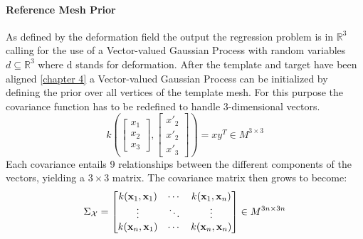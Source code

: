 \paragraph{Reference Mesh Prior}
As defined by the deformation field the output the regression problem is in $\mathbb{R}^3$ calling for the use of a Vector-valued Gaussian Process with random variables $d \subseteq \mathbb{R}^3$ where d stands for deformation. 
After the template and target have been aligned \ref{chapter 4} a Vector-valued Gaussian Process can be initialized by defining the prior over all vertices of the template mesh. For this purpose the covariance function has to be redefined to handle 3-dimensional vectors.
\begin{equation}
    k\left(
    \begin{bmatrix}x_{1}\\x_{2}\\x_{3}\end{bmatrix},
    \begin{bmatrix}x'_{2}\\x'_{2}\\x'_{3}\end{bmatrix}
    \right) = x y^T \in M^{3 \times 3}
\end{equation}
Each covariance entails 9 relationships between the different components of the vectors, yielding a $3 \times 3$ matrix. The covariance matrix then grows to become: 
\begin{equation}
    \Sigma_{\mathcal{X}} = 
\begin{bmatrix}
    k(\textbf{x}_{1},\textbf{x}_{1}) & \cdots & k(\textbf{x}_{1},\textbf{x}_{n}) \\
\vdots & \ddots & \vdots \\
k(\textbf{x}_{n},\textbf{x}_{1}) & \cdots & k(\textbf{x}_{n},\textbf{x}_{n})
\end{bmatrix} \in M^{3n \times 3n}
\end{equation}


